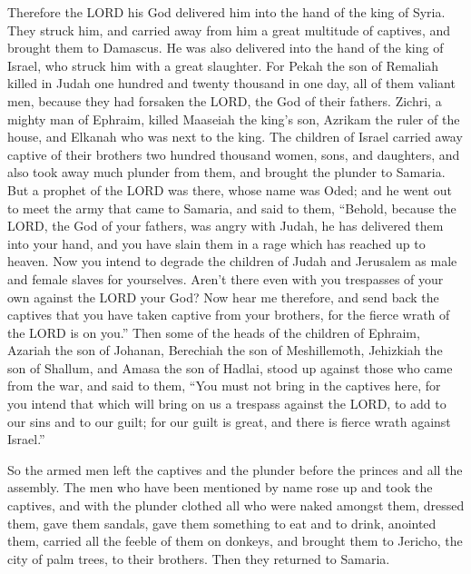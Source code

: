  Therefore the LORD his God delivered him into the hand of
the king of Syria. They struck him, and carried away from him a great
multitude of captives, and brought them to Damascus. He was also
delivered into the hand of the king of Israel, who struck him with a
great slaughter.  For Pekah the son of Remaliah killed in
Judah one hundred and twenty thousand in one day, all of them valiant
men, because they had forsaken the LORD, the God of their fathers.
 Zichri, a mighty man of Ephraim, killed Maaseiah the king's
son, Azrikam the ruler of the house, and Elkanah who was next to the
king.  The children of Israel carried away captive of their
brothers two hundred thousand women, sons, and daughters, and also took
away much plunder from them, and brought the plunder to Samaria.
 But a prophet of the LORD was there, whose name was Oded;
and he went out to meet the army that came to Samaria, and said to them,
``Behold, because the LORD, the God of your fathers, was angry with
Judah, he has delivered them into your hand, and you have slain them in
a rage which has reached up to heaven.  Now you intend to
degrade the children of Judah and Jerusalem as male and female slaves
for yourselves. Aren't there even with you trespasses of your own
against the LORD your God?  Now hear me therefore, and send
back the captives that you have taken captive from your brothers, for
the fierce wrath of the LORD is on you.''  Then some of the
heads of the children of Ephraim, Azariah the son of Johanan, Berechiah
the son of Meshillemoth, Jehizkiah the son of Shallum, and Amasa the son
of Hadlai, stood up against those who came from the war, 
and said to them, ``You must not bring in the captives here, for you
intend that which will bring on us a trespass against the LORD, to add
to our sins and to our guilt; for our guilt is great, and there is
fierce wrath against Israel.''

 So the armed men left the captives and the plunder before
the princes and all the assembly.  The men who have been
mentioned by name rose up and took the captives, and with the plunder
clothed all who were naked amongst them, dressed them, gave them
sandals, gave them something to eat and to drink, anointed them, carried
all the feeble of them on donkeys, and brought them to Jericho, the city
of palm trees, to their brothers. Then they returned to Samaria.

